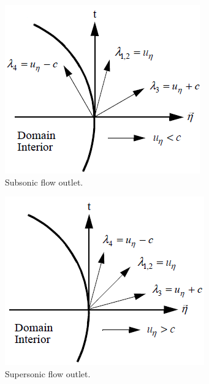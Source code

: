 %
%
\begin{figure}[H]
        \centering
        \begin{subfigure}[b]{0.495\textwidth}
                \centering
                \includegraphics[width=\textwidth]{figures/sub_exit_bc.png}
                \caption{Subsonic flow outlet.}
                \label{fig:sub_flow_outlet}
        \end{subfigure}%
        \begin{subfigure}[b]{0.495\textwidth}
                \centering
                \includegraphics[width=\textwidth]{figures/sup_exit_bc.png}
                \caption{Supersonic flow outlet.}
                \label{fig:sup_flow_outlet}
        \end{subfigure}
        \caption{\label{fig:outlet_sct3}}
\end{figure}
